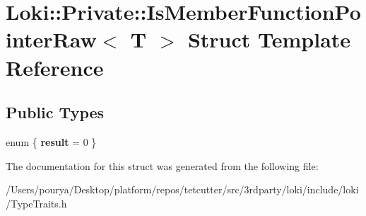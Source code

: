 \hypertarget{structLoki_1_1Private_1_1IsMemberFunctionPointerRaw}{}\section{Loki\+:\+:Private\+:\+:Is\+Member\+Function\+Pointer\+Raw$<$ T $>$ Struct Template Reference}
\label{structLoki_1_1Private_1_1IsMemberFunctionPointerRaw}
\subsection*{Public Types}
\begin{DoxyCompactItemize}
\item 
\hypertarget{structLoki_1_1Private_1_1IsMemberFunctionPointerRaw_a66a5dca49ad6a1cbfe24528b0bb236bf}{}enum \{ {\bfseries result} = 0
 \}\label{structLoki_1_1Private_1_1IsMemberFunctionPointerRaw_a66a5dca49ad6a1cbfe24528b0bb236bf}

\end{DoxyCompactItemize}


The documentation for this struct was generated from the following file\+:\begin{DoxyCompactItemize}
\item 
/\+Users/pourya/\+Desktop/platform/repos/tetcutter/src/3rdparty/loki/include/loki/Type\+Traits.\+h\end{DoxyCompactItemize}
